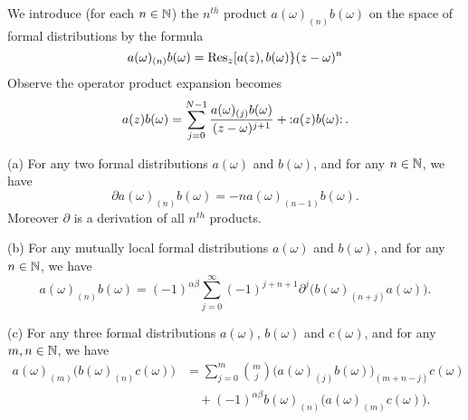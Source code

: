\M
We introduce (for each $n\in\NN$) the $n^{th}$ product
$a(\omega)_{(n)}b(\omega)$ on the space of formal distributions by the
formula
\begin{equation}
a(\omega)_{(n)}b(\omega)=\Res[z]{\superb{a(z)}{b(\omega)}(z-\omega)^{n}}
\end{equation}
Observe the operator product expansion becomes
\begin{equation}
a(z)b(\omega)=\sum^{N-1}_{j=0}\frac{a(\omega)_{(j)}b(\omega)}{(z-\omega)^{j+1}}+\normOrd{a(z)b(\omega)}.
\end{equation}

(a) For any two formal distributions $a(\omega)$ and $b(\omega)$, and
for any $n\in\NN$, we have
\begin{equation}
\partial a(\omega)_{(n)}b(\omega)=-na(\omega)_{(n-1)}b(\omega).
\end{equation}
Moreover $\partial$ is a derivation of all $n^{th}$ products.

(b) For any mutually local formal distributions $a(\omega)$ and
$b(\omega)$, and for any $n\in\NN$, we have
\begin{equation}
a(\omega)_{(n)}b(\omega)=(-1)^{\alpha\beta}\sum^{\infty}_{j=0}(-1)^{j+n+1}\partial^{j}\bigl(b(\omega)_{(n+j)}a(\omega)\bigr).
\end{equation}

(c) For any three formal distributions $a(\omega)$, $b(\omega)$ and
$c(\omega)$, and for any $m,n\in\NN$, we have
\begin{equation}
\begin{split}
a(\omega)_{(m)}\bigl(b(\omega)_{(n)}c(\omega)\bigr)
&=\sum^{m}_{j=0}\binom{m}{j}\bigl(a(\omega)_{(j)}b(\omega)\bigr)_{(m+n-j)}c(\omega)\\
&\quad+(-1)^{\alpha\beta}b(\omega)_{(n)}\bigl(a(\omega)_{(m)}c(\omega)\bigr).
\end{split}
\end{equation}

